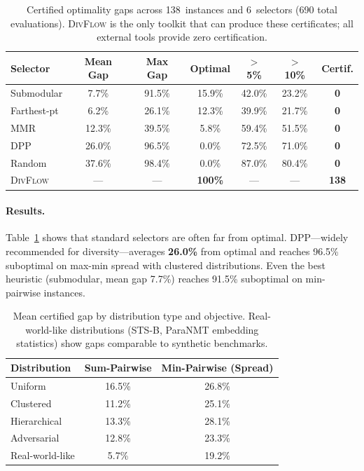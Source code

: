 \documentclass[11pt,a4paper]{article}
\newcommand{\divflow}{\textsc{DivFlow}}
\begin{document}
\begin{table}[t]
\centering
\caption{Certified optimality gaps across 138~instances and
  6~selectors (690 total evaluations). \divflow{} is the only
  toolkit that can produce these certificates; all external
  tools provide zero certification.}
\label{tab:certified}
\small
\begin{tabular}{@{}lcccccc@{}}
\toprule
\textbf{Selector} &
  \textbf{Mean Gap} &
  \textbf{Max Gap} &
  \textbf{Optimal} &
  \textbf{$>$5\%} &
  \textbf{$>$10\%} &
  \textbf{Certif.} \\
\midrule
Submodular    &  7.7\% &  91.5\% & 15.9\% & 42.0\% & 23.2\% & \textbf{0} \\
Farthest-pt   &  6.2\% &  26.1\% & 12.3\% & 39.9\% & 21.7\% & \textbf{0} \\
MMR           & 12.3\% &  39.5\% &  5.8\% & 59.4\% & 51.5\% & \textbf{0} \\
DPP           & 26.0\% &  96.5\% &  0.0\% & 72.5\% & 71.0\% & \textbf{0} \\
Random        & 37.6\% &  98.4\% &  0.0\% & 87.0\% & 80.4\% & \textbf{0} \\
\midrule
\divflow{}    & --- & --- & \textbf{100\%} & --- & --- & \textbf{138} \\
\bottomrule
\end{tabular}
\end{table}

\paragraph{Results.}
Table~\ref{tab:certified} shows that standard selectors are
often far from optimal.  DPP---widely recommended for
diversity---averages \textbf{26.0\%} from optimal and reaches
96.5\% suboptimal on max-min spread with clustered distributions.
Even the best heuristic (submodular, mean gap 7.7\%) reaches
91.5\% suboptimal on min-pairwise instances.

\begin{table}[t]
\centering
\caption{Mean certified gap by distribution type and objective.
  Real-world-like distributions (STS-B, ParaNMT embedding
  statistics) show gaps comparable to synthetic benchmarks.}
\label{tab:certified-dist}
\small
\begin{tabular}{@{}lcc@{}}
\toprule
\textbf{Distribution} &
  \textbf{Sum-Pairwise} &
  \textbf{Min-Pairwise (Spread)} \\
\midrule
Uniform         & 16.5\% & 26.8\% \\
Clustered       & 11.2\% & 25.1\% \\
Hierarchical    & 13.3\% & 28.1\% \\
Adversarial     & 12.8\% & 23.3\% \\
Real-world-like & 5.7\%  & 19.2\% \\
\bottomrule
\end{tabular}
\end{table}
\end{document}
